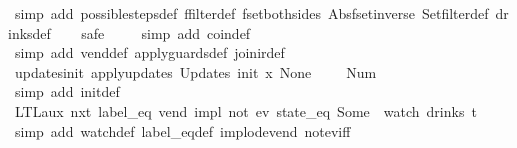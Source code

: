 \begin{isabellebody}
%
\isatagproof
{}\isamarkupfalse%
\ {\isacharparenleft}simp\ add{\isacharcolon}\ possible{\isacharunderscore}steps{\isacharunderscore}def\ ffilter{\isacharunderscore}def\ fset{\isacharunderscore}both{\isacharunderscore}sides\ Abs{\isacharunderscore}fset{\isacharunderscore}inverse\ Set{\isachardot}filter{\isacharunderscore}def\ drinks{\isacharunderscore}def{\isacharparenright}\isanewline
\ \ \isamarkupfalse%
\ safe\isanewline
\ \ \ \isamarkupfalse%
\ {\isacharparenleft}simp\ add{\isacharcolon}\ coin{\isacharunderscore}def{\isacharparenright}\isanewline
\ \ \isamarkupfalse%
\ {\isacharparenleft}simp\ add{\isacharcolon}\ vend{\isacharunderscore}def\ apply{\isacharunderscore}guards{\isacharunderscore}def\ join{\isacharunderscore}ir{\isacharunderscore}def{\isacharparenright}%
\endisatagproof
{\isafoldproof}%
%
\isadelimproof
\isanewline
%
\endisadelimproof
\isanewline
{}\isamarkupfalse%
\ updates{\isacharunderscore}init{\isacharcolon}\ {\isachardoublequoteopen}apply{\isacharunderscore}updates\ {\isacharparenleft}Updates\ init{\isacharparenright}\ {\isacharparenleft}{\isasymlambda}x{\isachardot}\ None{\isacharparenright}\ {\isacharless}{\isachargreater}\ {\isacharequal}\ {\isacharparenleft}{\isacharless}{\isachargreater}{\isacharparenleft}{}\ {\isacharcolon}{\isacharequal}\ Num\ {}{\isacharparenright}{\isacharparenright}{\isachardoublequoteclose}\isanewline
%
\isadelimproof
\ \ %
\endisadelimproof
%
\isatagproof
{}\isamarkupfalse%
\ {\isacharparenleft}simp\ add{\isacharcolon}\ init{\isacharunderscore}def{\isacharparenright}%
\endisatagproof
{\isafoldproof}%
%
\isadelimproof
\isanewline
%
\endisadelimproof
\isanewline
{}\isamarkupfalse%
\ LTL{\isacharunderscore}aux{}{\isacharcolon}\ {\isachardoublequoteopen}{\isacharparenleft}{\isacharparenleft}nxt\ {\isacharparenleft}label_eq\ {\isacharprime}{\isacharprime}vend{\isacharprime}{\isacharprime}{\isacharparenright}{\isacharparenright}\ impl\ not\ {\isacharparenleft}ev\ {\isacharparenleft}state_eq\ {\isacharparenleft}Some\ {}{\isacharparenright}{\isacharparenright}{\isacharparenright}{\isacharparenright}\ {\isacharparenleft}watch\ drinks\ t{\isacharparenright}{\isachardoublequoteclose}\isanewline
%
\isadelimproof
\ \ %
\endisadelimproof
%
\isatagproof
{}\isamarkupfalse%
\ {\isacharparenleft}simp\ add{\isacharcolon}\ watch{\isacharunderscore}def\ label_eq{\isacharunderscore}def\ implode{\isacharunderscore}vend\ not{\isacharunderscore}ev{\isacharunderscore}iff{\isacharparenright}\isanewline

\end{isabellebody}
